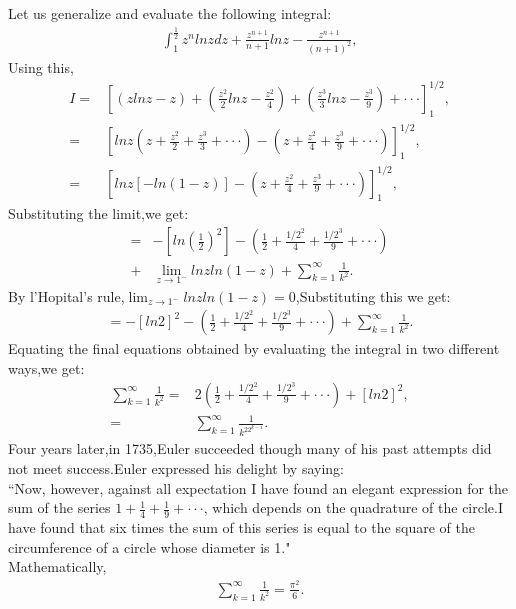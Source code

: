 \documentclass[a4paper,reqno,11pt]{book}
\theoremstyle{plain}%
\theoremstyle{definition}
\begin{document}
Let us generalize and evaluate the following integral:
\begin{eqnarray*}
    \int_{1}^{\frac{1}{2}}z^nlnzdz+\frac{z^{n+1}}{n+1}lnz-\frac{z^{n+1}}{(n+1)^2},
\end{eqnarray*}
Using this,
\begin{align*}
    I=&\left[(zlnz-z)+\left(\frac{z^2}{2}lnz-\frac{z^2}{4}\right)+\left(\frac{z^3}{3}lnz-\frac{z^3}{9}\right)+\cdot\cdot\cdot\right]_1^{1/2},\\
    =&\left[lnz\left(z+\frac{z^2}{2}+\frac{z^3}{3}+\cdot\cdot\cdot\right)-\left(z+\frac{z^2}{4}+\frac{z^3}{9}+\cdot\cdot\cdot\right)\right]_1^{1/2},\\
    =&\left[lnz\left[-ln(1-z)\right]-\left(z+\frac{z^2}{4}+\frac{z^3}{9}+\cdot\cdot\cdot\right)\right]_1^{1/2},
\end{align*}
Substituting the limit,we get:
\begin{align*}
    =&-\left[ln\left(\frac{1}{2}\right)^2\right]-\left(\frac{1}{2}+\frac{1/2^2}{4}+\frac{1/2^3}{9}+\cdot\cdot\cdot\right)\\
    +&\lim_{z\to1^{-}}lnzln(1-z)+\sum_{k=1}^{\infty}\frac{1}{k^2}.
\end{align*}
By l'Hopital's rule,$\lim_{z\to1^{-}}lnzln(1-z)=0$,Substituting this we get:\\
\begin{eqnarray*}
    =-[ln2]^2-\left(\frac{1}{2}+\frac{1/2^2}{4}+\frac{1/2^3}{9}+\cdot\cdot\cdot\right)+\sum_{k=1}^{\infty}\frac{1}{k^2}.
\end{eqnarray*}
\noindent Equating the final equations obtained by evaluating the integral in two different ways,we get:
\begin{align*}
    \sum_{k=1}^{\infty}\frac{1}{k^2}=&2\left(\frac{1}{2}+\frac{1/2^2}{4}+\frac{1/2^3}{9}+\cdot\cdot\cdot\right)+[ln2]^2,\\
    =&\sum_{k=1}^{\infty}\frac{1}{k^22^{k-1}}.
\end{align*}
Four years later,in 1735,Euler succeeded though many of his past attempts did not meet success.Euler expressed his delight by saying:\\
``Now, however, against all expectation I have found an elegant expression for the sum of the series $1+\frac{1}{4}+\frac{1}{9}+\cdot\cdot\cdot$, which depends on the quadrature of the circle.I have found that six times the sum of this series is equal to the square of the circumference of a circle whose diameter is 1."\\
Mathematically,
\begin{eqnarray*}
    \sum_{k=1}^{\infty}\frac{1}{k^2}=\frac{\pi^2}{6}.
\end{eqnarray*}
\end{document}
